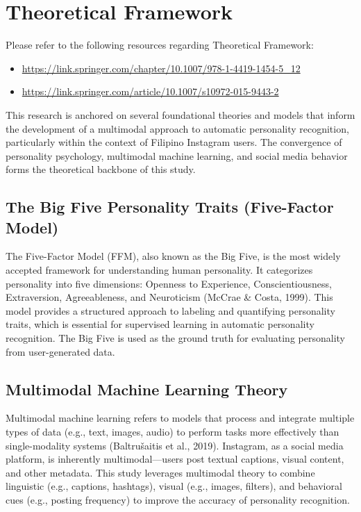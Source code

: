 %
%
%                 

\chapter{Theoretical Framework}
\label{sec:theoframework}
Please refer to the following resources regarding Theoretical Framework: 

\begin{itemize}

\item \url{https://link.springer.com/chapter/10.1007/978-1-4419-1454-5_12}
\item \url{https://link.springer.com/article/10.1007/s10972-015-9443-2}



\end{itemize}
This research is anchored on several foundational theories and models that inform the development of a multimodal approach to automatic personality recognition, particularly within the context of Filipino Instagram users. The convergence of personality psychology, multimodal machine learning, and social media behavior forms the theoretical backbone of this study.

\section{The Big Five Personality Traits (Five-Factor Model)}
The Five-Factor Model (FFM), also known as the Big Five, is the most widely accepted framework for understanding human personality. It categorizes personality into five dimensions: Openness to Experience, Conscientiousness, Extraversion, Agreeableness, and Neuroticism (McCrae & Costa, 1999). This model provides a structured approach to labeling and quantifying personality traits, which is essential for supervised learning in automatic personality recognition. The Big Five is used as the ground truth for evaluating personality from user-generated data.

\section{Multimodal Machine Learning Theory}
Multimodal machine learning refers to models that process and integrate multiple types of data (e.g., text, images, audio) to perform tasks more effectively than single-modality systems (Baltrušaitis et al., 2019). Instagram, as a social media platform, is inherently multimodal—users post textual captions, visual content, and other metadata. This study leverages multimodal theory to combine linguistic (e.g., captions, hashtags), visual (e.g., images, filters), and behavioral cues (e.g., posting frequency) to improve the accuracy of personality recognition.

